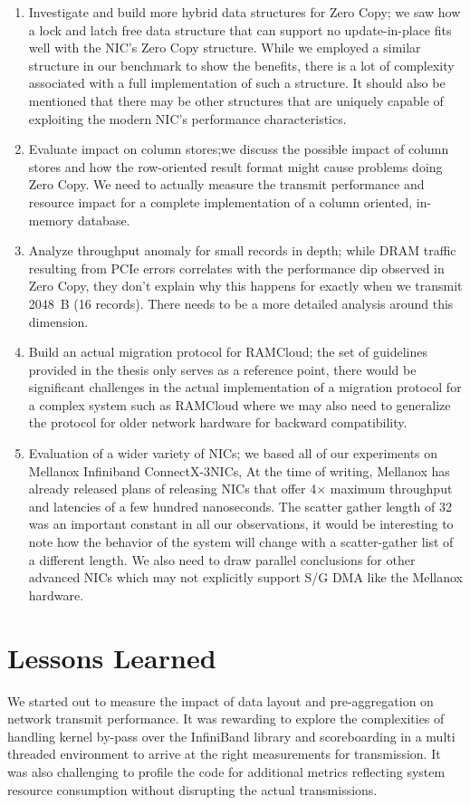 \begin{enumerate}
\item Investigate and build more hybrid data structures for Zero Copy; we saw how a lock and latch free data structure that can support no update-in-place 
fits well with the NIC's Zero Copy structure. While we employed a similar structure in our benchmark to show the benefits, there is a lot of complexity associated 
with a full implementation of such a structure. It should also be mentioned that there may be other structures that are uniquely capable of exploiting the modern NIC's 
performance characteristics.
\item Evaluate impact on column stores;we discuss the possible impact of column stores and how the row-oriented result format might cause problems doing Zero Copy. We need 
to actually measure the transmit performance and resource impact for a complete implementation of a column oriented, in-memory database.
\item Analyze throughput anomaly for small records in depth; while DRAM traffic resulting from PCIe errors correlates with the performance dip observed in Zero Copy, 
they don't explain why this happens for exactly when we transmit 2048~B (16 records). There needs to be a more detailed analysis around this dimension.
\item Build an actual migration protocol for RAMCloud; the set of guidelines provided in the thesis only serves as a reference point, there would be significant challenges 
in the actual implementation of a migration protocol for a complex system such as RAMCloud where we may also need to generalize the protocol for older network hardware for backward 
compatibility.
\item Evaluation of a wider variety of NICs; we based all of our experiments on Mellanox Infiniband ConnectX-3\textregistered NICs, At the time of writing, Mellanox has already 
released plans of releasing NICs that offer 4$\times$ maximum throughput and latencies of a few hundred nanoseconds. The scatter gather length of 32 was an important constant in 
all our observations, it would be interesting to note how the behavior of the system will change with a scatter-gather list of a different length. We also need to draw parallel 
conclusions for other advanced NICs which may not explicitly support S/G DMA like the Mellanox hardware.
\end{enumerate}

\section{Lessons Learned}
We started out to measure the impact of data layout and pre-aggregation on network transmit performance. 
It was rewarding to explore the complexities of handling kernel by-pass over the InfiniBand library and 
scoreboarding in a multi threaded environment to arrive at the right measurements for transmission.
It was also challenging to profile the code for additional metrics reflecting system resource consumption 
without disrupting the actual transmissions. 

